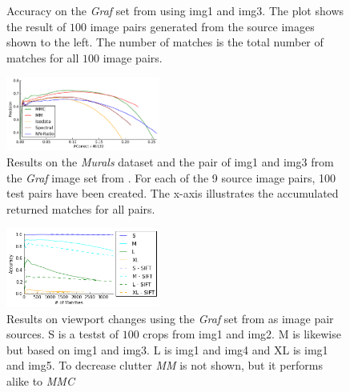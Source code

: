 \documentclass[12pt,journal]{IEEEtran}
\begin{document}
\begin{figure}
{\begin{subfigure}[t]{.27\textwidth}
		\end{subfigure}%
	}%
	\label{fig:results_graf}
	\caption{Accuracy on the \emph{Graf} set from 
		\cite{mikolajczyk2005performance} using img1 and img3. The plot 
	shows the result of $100$ image pairs generated from the source 
images shown to the left. The number of matches is the total number of 
matches for all $100$ image pairs.}
\end{figure}

\begin{figure}
	\centering
	\includegraphics[width=0.45\textwidth]{images/result_accumulated}
	\caption{Results on the \emph{Murals} dataset and the pair of img1 
		and img3 from the \emph{Graf} image set from 	
		\cite{mikolajczyk2005performance}. For each of the 9 source 
		image pairs, 100 test pairs have been created.  The x-axis 
	illustrates the accumulated returned matches for all pairs.}
	\label{fig:result_accumulated}
\end{figure}

\begin{figure}
	\centering
	\includegraphics[width=0.45\textwidth]{images/result_viewport}
	\caption{Results on viewport changes using the \emph{Graf} set from 
		\cite{mikolajczyk2005performance} as image pair sources. S is a 
		testst of $100$ crops from img1 and img2. M is likewise but 
	based on img1 and img3.  L is img1 and img4 and XL is img1 and img5.  
To decrease clutter \emph{MM} is not shown, but it performs alike to 
\emph{MMC}}
	\label{fig:result_viewport}
\end{figure}
\end{document}
